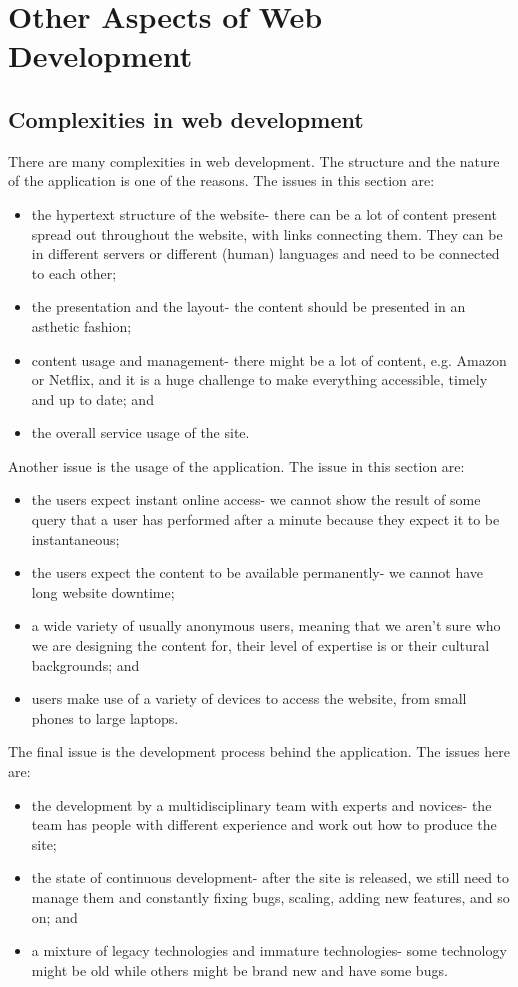 \documentclass[a4paper, openany]{memoir}
\begin{document}
\chapter{Other Aspects of Web Development}

\section{Complexities in web development}
There are many complexities in web development. The structure and the nature of the application is one of the reasons. The issues in this section are: 
\begin{itemize}
    \item the hypertext structure of the website- there can be a lot of content present spread out throughout the website, with links connecting them. They can be in different servers or different (human) languages and need to be connected to each other; 
    \item the presentation and the layout- the content should be presented in an asthetic fashion; 
    \item content usage and management- there might be a lot of content, e.g. Amazon or Netflix, and it is a huge challenge to make everything accessible, timely and up to date; and
    \item the overall service usage of the site.
\end{itemize}
Another issue is the usage of the application. The issue in this section are:
\begin{itemize}
    \item the users expect instant online access- we cannot show the result of some query that a user has performed after a minute because they expect it to be instantaneous;
    \item the users expect the content to be available permanently- we cannot have long website downtime; 
    \item a wide variety of usually anonymous users, meaning that we aren't sure who we are designing the content for, their level of expertise is or their cultural backgrounds; and
    \item users make use of a variety of devices to access the website, from small phones to large laptops.
\end{itemize}
The final issue is the development process behind the application. The issues here are:
\begin{itemize}
    \item the development by a multidisciplinary team with experts and novices- the team has people with different experience and work out how to produce the site;
    \item the state of continuous development- after the site is released, we still need to manage them and constantly fixing bugs, scaling, adding new features, and so on; and
    \item a mixture of legacy technologies and immature technologies- some technology might be old while others might be brand new and have some bugs.
\end{itemize}
\end{document}
